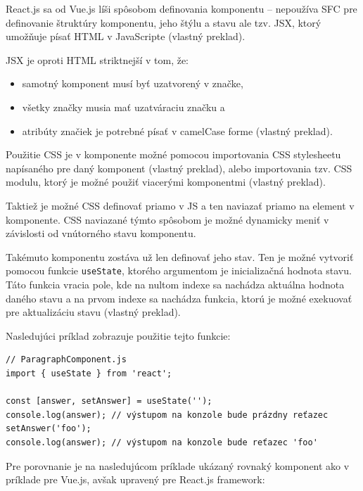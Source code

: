 React.js sa od Vue.js líši spôsobom definovania komponentu -- nepoužíva SFC pre definovanie štruktúry komponentu, jeho štýlu a stavu ale tzv. JSX, ktorý umožňuje písať HTML v JavaScripte \cite{about_react} (vlastný preklad).

JSX je oproti HTML striktnejší v tom, že:
\begin{itemize}
\item {samotný komponent musí byť uzatvorený v značke,}
\item {všetky značky musia mať uzatváraciu značku a}
\item {atribúty značiek je potrebné písať v camelCase forme \cite{jsx_rules} (vlastný preklad).}
\end{itemize}

Použitie CSS je v komponente možné pomocou importovania CSS stylesheetu napísaného pre daný komponent \cite{reactjs_stylesheet} (vlastný preklad), alebo importovania tzv. CSS modulu, ktorý je možné použiť viacerými komponentmi \cite{reactjs_stylesheet_module} (vlastný preklad).

Taktiež je možné CSS definovať priamo v JS a ten naviazať priamo na element v komponente. CSS naviazané týmto spôsobom je možné dynamicky meniť v závislosti od vnútorného stavu komponentu.

Takémuto komponentu zostáva už len definovať jeho stav. Ten je možné vytvoriť pomocou funkcie \texttt{useState}, ktorého argumentom je inicializačná hodnota stavu. Táto funkcia vracia pole, kde na nultom indexe sa nachádza aktuálna hodnota daného stavu a na prvom indexe sa nachádza funkcia, ktorú je možné exekuovať pre aktualizáciu stavu \cite{react_state} (vlastný preklad).

Nasledujúci príklad zobrazuje použitie tejto funkcie:

\begin{minipage}[]{\linewidth}
\begin{verbatim}
// ParagraphComponent.js
import { useState } from 'react';

const [answer, setAnswer] = useState('');
console.log(answer); // výstupom na konzole bude prázdny reťazec
setAnswer('foo');
console.log(answer); // výstupom na konzole bude reťazec 'foo'
\end{verbatim}
\end{minipage}

\clearpage

Pre porovnanie je na nasledujúcom príklade ukázaný rovnaký komponent ako v príklade pre Vue.js, avšak upravený pre React.js framework:

